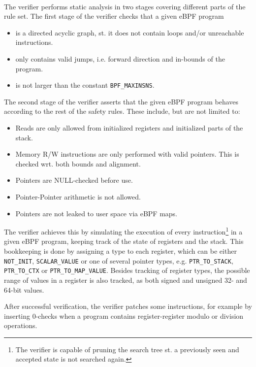 \paragraph{}
The verifier performs static analysis in two stages covering different parts of the rule set.
The first stage of the verifier checks that a given eBPF program
\begin{itemize}
\item is a directed acyclic graph, st. it does not contain loops and/or unreachable instructions.
\item only contains valid jumps, i.e. forward direction and in-bounds of the program.
\item is not larger than the constant \texttt{BPF\_MAXINSNS}.
\end{itemize}

The second stage of the verifier asserts that the given eBPF program behaves according to the rest of the safety rules. These include, but are not limited to:
\begin{itemize}
\item Reads are only allowed from initialized registers and initialized parts of the stack. 
\item Memory R/W instructions are only performed with valid pointers. This is checked wrt. both bounds and alignment.
\item Pointers are NULL-checked before use. 
\item Pointer-Pointer arithmetic is not allowed.
  \item Pointers are not leaked to user space via eBPF maps. 
\end{itemize}

The verifier achieves this by simulating the execution of every instruction\footnote{The verifier is capable of pruning the search tree st. a previously seen and accepted state is not searched again.} in a given eBPF program, keeping track of the state of registers and the stack. This bookkeeping is done by assigning a type to each register, which can be either \texttt{NOT\_INIT}, \texttt{SCALAR\_VALUE} or one of several pointer types, e.g. \texttt{PTR\_TO\_STACK}, \texttt{PTR\_TO\_CTX} or \texttt{PTR\_TO\_MAP\_VALUE}.
Besides tracking of register types, the possible range of values in a register is also tracked, as both signed and unsigned 32- and 64-bit values.


After successful verification, the verifier patches some instructions, for example by inserting 0-checks when a program contains register-register modulo or division operations.


